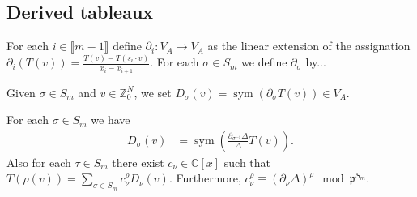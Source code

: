 \documentclass[11pt,fleqn]{article}
\newcommand\CC{\mathbb C}
\newcommand\ZZ{\mathbb Z}
\newcommand\p{\mathfrak p}
\renewcommand\to{\longrightarrow}
\newcommand\interval[1]{\llbracket #1 \rrbracket}
\DeclareMathOperator\sym{sym}
\begin{document}
\subsection{Derived tableaux}
For each $i \in \interval{m-1}$ define $\partial_i: V_A \to V_A$ as the linear
extension of the assignation $\partial_i(T(v)) = \frac{T(v) - T(s_i \cdot v)}
{x_i - x_{i+1}}$. For each $\sigma \in S_m$ we define $\partial_\sigma$ by...

\begin{Definition}
Given $\sigma \in S_m$ and $v \in \ZZ_0^N$, we set $D_\sigma(v) = 
\sym(\partial_\sigma T(v)) \in V_A$.
\end{Definition}

\begin{Lemma}
For each $\sigma \in S_m$ we have
\begin{align*}
D_\sigma(v) 
  &= \sym \left(
    \frac{\partial_{\sigma^{-1}} \Delta}{\Delta} T(v)
  \right).
\end{align*}
Also for each $\tau \in S_m$ there exist $c_{\nu} \in \CC[x]$ such 
that $T(\rho(v)) = \sum_{\sigma \in S_m} c^\rho_\nu D_\nu(v)$.
Furthermore, $c^{\rho}_\nu \equiv (\partial_\nu \Delta)^\rho \mod 
\p^{S_m}$.
\end{Lemma}
\end{document}
